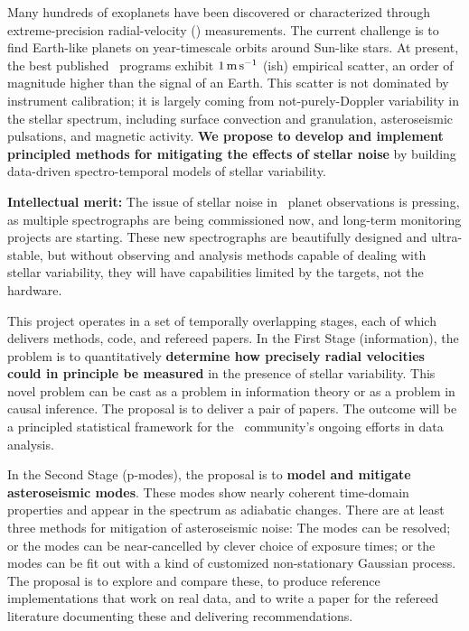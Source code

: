 \documentclass[12pt, fullpage, letterpaper]{article}
\begin{document}
\noindent
Many hundreds of exoplanets have been discovered or characterized
through extreme-precision radial-velocity (\EPRV) measurements.
The current challenge is to find
Earth-like planets on year-timescale orbits around Sun-like stars. At present, the best
published \EPRV\ programs exhibit $1\,{\mathrm{m\,s^{-1}}}$ (ish) empirical scatter, an
order of magnitude higher than the signal of an Earth. This scatter is
not dominated by instrument calibration; 
it is largely coming from not-purely-Doppler
variability in the stellar spectrum, including surface convection and
granulation, asteroseismic pulsations, and magnetic activity.
\textbf{We propose to develop and implement principled methods for mitigating
the effects of stellar noise} by building data-driven
spectro-temporal models of stellar variability.

\textbf{Intellectual merit:}
The issue of stellar noise in \RV\ planet observations is pressing,
as multiple spectrographs are being commissioned now, and long-term
monitoring projects are starting.
These new spectrographs are beautifully designed and ultra-stable,
but without observing and analysis methods capable of
dealing with stellar variability, they will have capabilities limited
by the targets, not the hardware.

This project operates in a set of temporally overlapping stages, each
of which delivers methods, code, and refereed papers. In the First
Stage (information), the problem is to quantitatively \textbf{determine how
precisely radial velocities could in principle be measured} in the
presence of stellar variability. This novel problem can be cast as a problem
in information theory or as a problem in causal inference. The
proposal is to deliver a pair of
papers. The outcome will be a principled statistical framework for the
\EPRV\ community’s ongoing efforts in data analysis.

In the Second Stage (p-modes), the proposal is to \textbf{model and mitigate
asteroseismic modes}. These modes show nearly coherent time-domain
properties and appear in the spectrum as adiabatic changes. There are
at least three methods for mitigation of asteroseismic noise: The
modes can be resolved; or the modes can be
near-cancelled by clever choice of exposure times; or the modes can be
fit out with a kind of customized non-stationary
Gaussian process. The proposal is to explore and compare these, to
produce reference implementations that work on real data, and to write
a paper for the refereed literature documenting these and delivering
recommendations.
\end{document}
